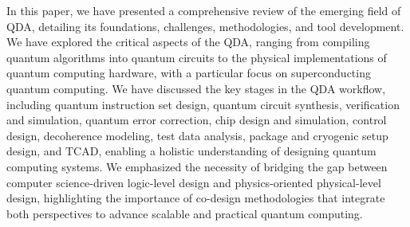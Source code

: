 \documentclass[a4paper,onecolumn,11pt,unpublished]{quantumarticle}
\begin{document}
In this paper, we have presented a comprehensive review of the emerging field of QDA, detailing its foundations, challenges, methodologies, and tool development. We have explored the critical aspects of the QDA, ranging from compiling quantum algorithms into quantum circuits to the physical implementations of quantum computing hardware, with a particular focus on superconducting quantum computing. We have discussed the key stages in the QDA workflow, including quantum instruction set design, quantum circuit synthesis, verification and simulation, quantum error correction, chip design and simulation, control design, decoherence modeling, test data analysis, package and cryogenic setup design, and TCAD, enabling a holistic understanding of designing quantum computing systems. We emphasized the necessity of bridging the gap between computer science-driven logic-level design and physics-oriented physical-level design, highlighting the importance of co-design methodologies that integrate both perspectives to advance scalable and practical quantum computing. 
\end{document}
